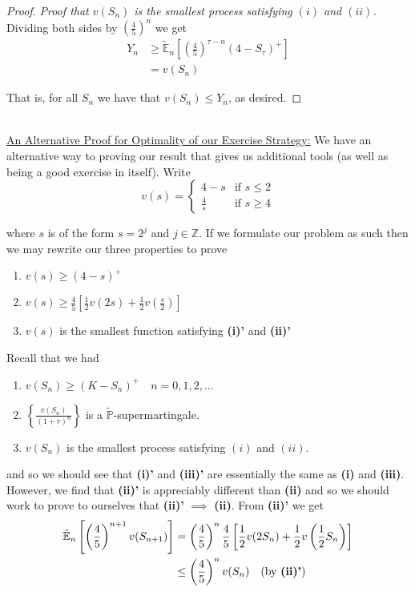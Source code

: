 \documentclass[12pt]{article}
\newcommand{\Z}{\mathbb Z}
\renewcommand{\P}{\mathbb P}
\newcommand{\E}{\mathbb E}
\begin{document}
\begin{proof} {\em Proof that $v(S_n)$ is the smallest process satisfying $(i)$ and $(ii)$.}
Dividing both sides by $\left(\frac{4}{5}\right)^n$ we get
\begin{align*}
	Y_n &\geq \tilde{\E}_n \left[ \left( \frac{4}{5} \right)^{\tau - n} (4 - S_\tau)^+ \right] \\
	&= v(S_n)
\end{align*}

That is, for all $S_n$ we have that $v(S_n) \leq Y_n$, as desired.
\end{proof} \hfill\\

\underline{An Alternative Proof for Optimality of our Exercise Strategy:} We have an alternative way to proving our result that gives us additional tools (as well as being a good exercise in itself). Write
\begin{equation*}
	v(s) = 
	\begin{cases}
		4 - s & \text{if } s \leq 2 \\
		\frac{4}{s} & \text{if } s \geq 4
	\end{cases}
\end{equation*}

where $s$ is of the form $s = 2^j$ and $j \in \Z$. If we formulate our problem as such then we may rewrite our three properties to prove
\begin{enumerate}[\bf (i)']
	\item $v(s) \geq (4 - s)^+$
	\item $v(s) \geq \frac{4}{5}\left[\frac{1}{2} v(2s) + \frac{1}{2}v(\frac{s}{2}) \right]$
	\item $v(s)$ is the smallest function satisfying {\bf (i)'} and {\bf (ii)'}
\end{enumerate}

Recall that we had 
\begin{enumerate}[\bf (i)]
	\item $v(S_n) \geq (K - S_n)^+ \quad n = 0,1,2,...$
	\item $\left\{ \frac{v(S_n)}{(1 + r)^n} \right\} $ is a $\tilde{\P}$-supermartingale. 
	\item $v(S_n)$ is the smallest process satisfying $(i)$ and $(ii)$.
\end{enumerate}

and so we should see that {\bf (i)'} and {\bf (iii)'} are essentially the same as {\bf (i)} and {\bf (iii)}. However, we find that {\bf (ii)'} is appreciably different than {\bf (ii)} and so we should work to prove to ourselves that {\bf (ii)'} $\implies$ {\bf (ii)}. From {\bf (ii)'} we get
\begin{align*}
	\tilde{\E}_n\left[ \left( \frac{4}{5} \right)^{n + 1} v(S_{n + 1}) \right] &= \left(\frac{4}{5}\right)^n \frac{4}{5} \left[ \frac{1}{2} v(2S_n) + \frac{1}{2} v\left( \frac{1}{2}S_n \right) \right] \\
	&\leq \left( \frac{4}{5} \right)^n v(S_n) \quad \text{(by {\bf (ii)'})} \\
\end{align*}
\end{document}
